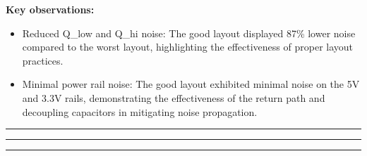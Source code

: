 \documentclass[a4paper,11pt]{article}%
\begin{document}
\textbf{Key observations:}
\begin{itemize}
	\item Reduced Q\_low and Q\_hi noise: The good layout displayed 87\% lower noise compared to the worst layout, highlighting the effectiveness of proper layout practices.
	\item Minimal power rail noise: The good layout exhibited minimal noise on the 5V and 3.3V rails, demonstrating the effectiveness of the return path and decoupling capacitors in mitigating noise propagation.
\end{itemize}





\pagebreak
\hrule
\hrule
\hrule






\end{document}

